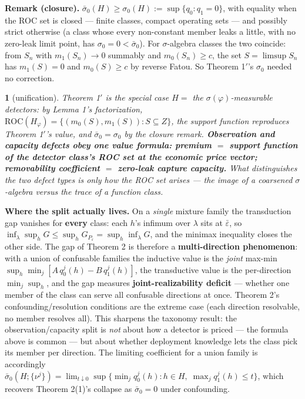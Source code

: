 \documentclass[11pt]{article}
\theoremstyle{plain}
\newtheorem*{namedthminner}{\namedthmname}
\newenvironment{nthm}[1]{\def\namedthmname{#1}\begin{namedthminner}}{\end{namedthminner}}
\theoremstyle{definition}
\begin{document}
\textbf{Remark (closure).} $\bar\sigma_0(H) \geq \sigma_0(H) := \sup\{q_0 : q_1 =
0\}$, with equality when the ROC set is closed --- finite classes, compact
operating sets --- and possibly strict otherwise (a class whose every
non-constant member leaks a little, with no zero-leak limit point, has
$\sigma_0 = 0 < \bar\sigma_0$). For $\sigma$-algebra classes the two coincide: from
$S_n$ with $m_1(S_n) \to 0$ summably and $m_0(S_n) \geq c$, the set $S =
\limsup S_n$ has $m_1(S) = 0$ and $m_0(S) \geq c$ by reverse Fatou. So
Theorem 1$'$'s $\sigma_0$ needed no correction.

\begin{nthm}{Corollary}[unification]
Theorem 1$'$ is the special case $H = $ the
$\sigma(\varphi)$-measurable detectors: by Lemma 1's factorization,
$\mathrm{ROC}(H_\varphi) = \{(m_0(S), m_1(S)) : S \subseteq Z\}$, the support
function reproduces Theorem 1$'$'s value, and $\bar\sigma_0 = \sigma_0$ by the
closure remark. \textbf{Observation and capacity defects obey one value formula:
premium $=$ support function of the detector class's ROC set at the economic
price vector; removability coefficient $=$ zero-leak capture capacity.} What
distinguishes the two defect types is only how the ROC set arises --- the image
of a coarsened $\sigma$-algebra versus the trace of a function class.
\end{nthm}

\textbf{Where the split actually lives.} On a \emph{single} mixture family the
transduction gap vanishes for \textbf{every} class: each $h$'s infimum over
$\lambda$ sits at $\bar\varepsilon$, so
$\inf_\lambda \sup_h G \leq \sup_h G_{P_{\bar\varepsilon}} = \sup_h
\inf_\lambda G$, and the minimax inequality closes the other side. The gap of
Theorem 2 is therefore a \textbf{multi-direction phenomenon}: with a union of
confusable families the inductive value is the \emph{joint} max-min
$\sup_h \min_j [A\,q_0^j(h) - B\,q_1^j(h)]$, the transductive value is the
per-direction $\min_j \sup_h$, and the gap measures \textbf{joint-realizability
deficit} --- whether one member of the class can serve all confusable
directions at once. Theorem 2's confounding/resolution conditions are the
extreme case (each direction resolvable, no member resolves all). This
sharpens the taxonomy result: the observation/capacity split is \emph{not} about
how a detector is priced --- the formula above is common --- but about whether
deployment knowledge lets the class pick its member per direction. The
limiting coefficient for a union family is accordingly
$\bar\sigma_0(H; \{\nu^j\}) = \lim_{t \downarrow 0} \sup\{\min_j q_0^j(h) :
h \in H,\; \max_j q_1^j(h) \leq t\}$, which recovers Theorem 2(1)'s collapse
as $\bar\sigma_0 = 0$ under confounding.
\end{document}
